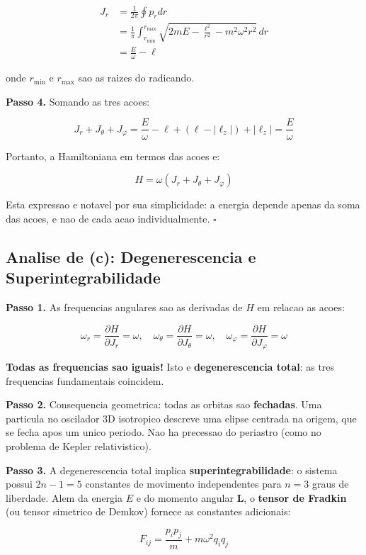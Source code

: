 \documentclass[12pt,a4paper,oneside]{article}
\begin{document}
\begin{align*}
J_r &= \frac{1}{2\pi}\oint p_r dr \\
&= \frac{1}{\pi}\int_{r_{\min}}^{r_{\max}}
\sqrt{2mE - \frac{\ell^2}{r^2} - m^2\omega^2r^2}\,dr \\
&= \frac{E}{\omega} - \ell
\end{align*}

onde $r_{\min}$ e $r_{\max}$ sao as raizes do radicando.

\textbf{Passo 4.} Somando as tres acoes:

$$J_r + J_\theta + J_\varphi = \frac{E}{\omega} - \ell + (\ell - |\ell_z|)
+ |\ell_z| = \frac{E}{\omega}$$

Portanto, a Hamiltoniana em termos das acoes e:

$$\boxed{H = \omega(J_r + J_\theta + J_\varphi)}$$

Esta expressao e notavel por sua simplicidade: a energia depende apenas da
soma das acoes, e nao de cada acao individualmente. $\square$

\subsection*{Analise de (c): Degenerescencia e Superintegrabilidade}

\textbf{Passo 1.} As frequencias angulares sao as derivadas de $H$ em
relacao as acoes:

$$\omega_r = \frac{\partial H}{\partial J_r} = \omega, \quad
\omega_\theta = \frac{\partial H}{\partial J_\theta} = \omega, \quad
\omega_\varphi = \frac{\partial H}{\partial J_\varphi} = \omega$$

\textbf{Todas as frequencias sao iguais!} Isto e \textbf{degenerescencia
total}: as tres frequencias fundamentais coincidem.

\textbf{Passo 2.} Consequencia geometrica: todas as orbitas sao
\textbf{fechadas}. Uma particula no oscilador 3D isotropico descreve uma
elipse centrada na origem, que se fecha apos um unico periodo. Nao ha
precessao do periastro (como no problema de Kepler relativistico).

\textbf{Passo 3.} A degenerescencia total implica \textbf{superintegrabilidade}:
o sistema possui $2n-1 = 5$ constantes de movimento independentes para $n=3$
graus de liberdade. Alem da energia $E$ e do momento angular $\mathbf{L}$, o
\textbf{tensor de Fradkin} (ou tensor simetrico de Demkov) fornece as
constantes adicionais:

$$F_{ij} = \frac{p_i p_j}{m} + m\omega^2 q_i q_j$$
\end{document}
